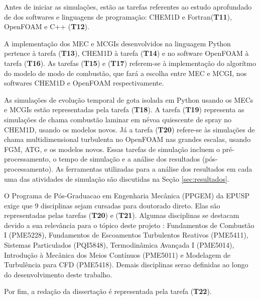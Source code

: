 Antes de iniciar as simulações, estão as tarefas referentes ao estudo aprofundado de dos softwares e linguagens de programação: CHEM1D e Fortran(\textbf{T11}), OpenFOAM e C++ 
(\textbf{T12}).

A implementação dos MEC e MCGIs desenvolvidos na linguagem Python pertence à tarefa  (\textbf{T13}),  CHEM1D à tarefa (\textbf{T14}) e no software OpenFOAM à tarefa (\textbf{T16}).
As tarefas (\textbf{T15}) e (\textbf{T17}) referem-se à implementação do algorítmo do modelo de modo de combustão, que fará a escolha entre MEC e MCGI, nos softwares CHEM1D e OpenFOAM respectivamente.

As simulações de evolução temporal de gota isolada em Python usando os MECs e MCGIs estão representadas pela tarefa (\textbf{T18}). 
A tarefa (\textbf{T19}) representa as simulações de chama combustão laminar em névoa quiescente de spray no CHEM1D, usando os modelos novos.
Já a tarefa (\textbf{T20}) refere-se às simulações de chama multidimensional turbulenta no OpenFOAM nas grandes escalas, usando FGM, ATG, e os modelos novos.
Essas tarefas de simulação incluem o pré-processamento, o tempo de simulação e a análise dos resultados (pós-processamento).
As ferramentas utilizadas para a análise dos resultados em cada uma das atividades de simulação são discutidas na Seção \ref{sec:resultados}.

O Programa de Pós-Graduacao em Engenharia Mecânica (PPGEM) da EPUSP exige que 9 disciplinas sejam cursadas para doutorado direto.
Elas são representadas pelas tarefas (\textbf{T20}) e (\textbf{T21}).
Algumas disciplinas se destacam devido a sua relevância para o tópico deste projeto : Fundamentos de Combustão I (PME5228), Fundamentos de Escoamentos Turbulentos Reativos  (PME5411), Sistemas Particulados (PQI5848), Termodinâmica Avançada I (PME5014), Introdução à Mecânica dos Meios Contínuos (PME5011) e Modelagem de Turbulência para CFD (PME5418).
Demais disciplinas serao definidas ao longo do desenvolvimento deste trabalho.

Por fim, a redação da dissertação é representada pela tarefa (\textbf{T22}).


